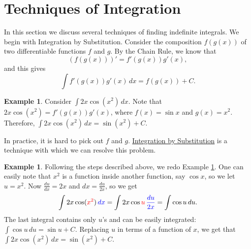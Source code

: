 \documentclass[12pt,letterpaper]{book}
\def\red{\textcolor{red}}
\def\blue{\textcolor{blue}}
\numberwithin{equation}{section}
\theoremstyle{definition}
\newtheorem{example}[thm]{\textbf{Example}}
\begin{document}
\section{Techniques of Integration}
In this section we discuss several techniques of finding indefinite integrals. We begin with Integration by Substitution. Consider the composition $f(g(x))$ of two differentiable functions $f$ and $g$. By the Chain Rule, we know that
$$(f(g(x)))'=f'(g(x))g'(x),$$
and this gives
$$\int f'(g(x))g'(x)\,dx=f(g(x))+C.$$

\begin{example} \label{subs example 1}
Consider $\displaystyle{\int 2x\cos (x^2)\,dx}$. Note that $2x\cos (x^2)=f'(g(x))g'(x)$, where $f(x)=\sin x$ and $g(x)=x^2$. Therefore,  $\displaystyle{\int 2x\cos (x^2)\,dx=\sin(x^2)+C}$.
\end{example}

In practice, it is hard to pick out $f$ and $g$. \underline{Integration by Substitution} is a technique with which we can resolve this problem. \\
\begin{center}
\end{center}
\medskip
\begin{example} Following the steps described above, we redo Example \ref{subs example 1}. One can easily note that $x^2$ is a function inside another function, say $\cos x$, so we let $u=x^2$. Now $\frac{du}{dx}=2x$ and $dx=\frac{du}{2x}$, so we get $$\int 2x\cos (\red{x^2})\,\blue{dx}=\int 2x\cos \red{u}\,\blue{\frac{du}{2x}}=\int \cos u\,du.$$ The last integral contains only $u$'s and can be easily integrated: $\displaystyle{\int \cos u\,du=\sin u + C}$. Replacing $u$ in terms of a function of $x$, we get that $\displaystyle{\int 2x\cos (x^2)\,dx=\sin(x^2)+C}$.
\end{example}
\end{document}
